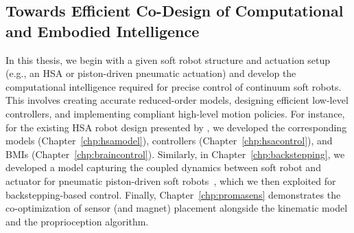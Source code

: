 \subsection{Towards Efficient Co-Design of Computational and Embodied Intelligence}
In this thesis, we begin with a given soft robot structure and actuation setup (e.g., an \gls{HSA} or piston-driven pneumatic actuation) and develop the computational intelligence required for precise control of continuum soft robots. This involves creating accurate reduced-order models, designing efficient low-level controllers, and implementing compliant high-level motion policies. For instance, for the existing \gls{HSA} robot design presented by \citet{lipton2018handedness, chin2018compliant, truby2021recipe}, we developed the corresponding models (Chapter~\ref{chp:hsamodel}), controllers (Chapter~\ref{chp:hsacontrol}), and \glspl{BMI} (Chapter~\ref{chp:braincontrol}). Similarly, in Chapter~\ref{chp:backstepping}, we developed a model capturing the coupled dynamics between soft robot and actuator for pneumatic piston-driven soft robots~\citep{marchese2014design, marchese2016design}, which we then exploited for backstepping-based control. Finally, Chapter~\ref{chp:promasens} demonstrates the co-optimization of sensor (and magnet) placement alongside the kinematic model and the proprioception algorithm.

